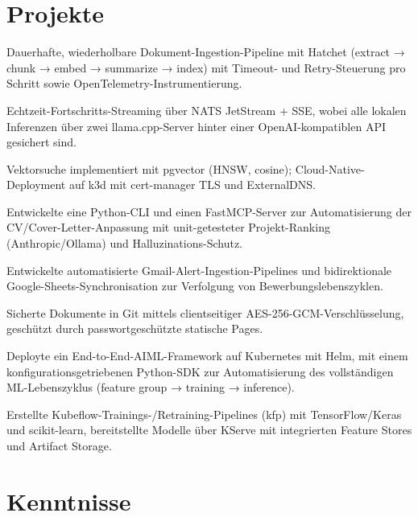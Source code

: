 \documentclass[10pt,a4paper]{resume}
\begin{document}
\section{Projekte}

\bullets
  \item Dauerhafte, wiederholbare Dokument-Ingestion-Pipeline mit Hatchet (extract → chunk → embed → summarize → index) mit Timeout- und Retry-Steuerung pro Schritt sowie OpenTelemetry-Instrumentierung.
  \item Echtzeit-Fortschritts-Streaming über NATS JetStream + SSE, wobei alle lokalen Inferenzen über zwei llama.cpp-Server hinter einer OpenAI-kompatiblen API gesichert sind.
  \item Vektorsuche implementiert mit pgvector (HNSW, cosine); Cloud-Native-Deployment auf k3d mit cert-manager TLS und ExternalDNS.
\bulletsend
\vspace{1.0pt}
\bullets
  \item Entwickelte eine Python-CLI und einen FastMCP-Server zur Automatisierung der CV/Cover-Letter-Anpassung mit unit-getesteter Projekt-Ranking (Anthropic/Ollama) und Halluzinations-Schutz.
  \item Entwickelte automatisierte Gmail-Alert-Ingestion-Pipelines und bidirektionale Google-Sheets-Synchronisation zur Verfolgung von Bewerbungslebenszyklen.
  \item Sicherte Dokumente in Git mittels clientseitiger AES-256-GCM-Verschlüsselung, geschützt durch passwortgeschützte statische Pages.
\bulletsend
\vspace{1.0pt}
\bullets
  \item Deployte ein End-to-End-AIML-Framework auf Kubernetes mit Helm, mit einem konfigurationsgetriebenen Python-SDK zur Automatisierung des vollständigen ML-Lebenszyklus (feature group → training → inference).
  \item Erstellte Kubeflow-Trainings-/Retraining-Pipelines (kfp) mit TensorFlow/Keras und scikit-learn, bereitstellte Modelle über KServe mit integrierten Feature Stores und Artifact Storage.
\bulletsend

\section{Kenntnisse}
\end{document}
